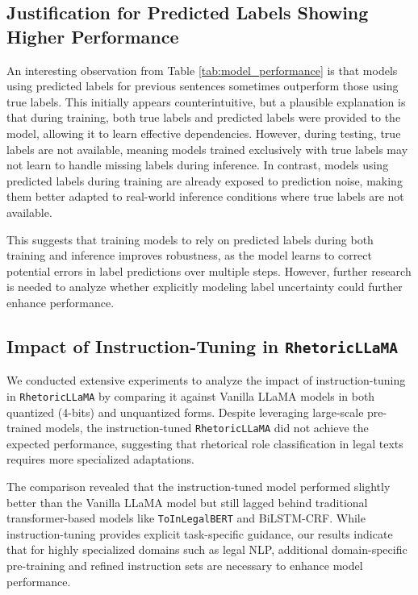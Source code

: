 \subsection{Justification for Predicted Labels Showing Higher Performance}
An interesting observation from Table \ref{tab:model_performance} is that models using predicted labels for previous sentences sometimes outperform those using true labels. This initially appears counterintuitive, but a plausible explanation is that during training, both true labels and predicted labels were provided to the model, allowing it to learn effective dependencies. However, during testing, true labels are not available, meaning models trained exclusively with true labels may not learn to handle missing labels during inference. In contrast, models using predicted labels during training are already exposed to prediction noise, making them better adapted to real-world inference conditions where true labels are not available.

This suggests that training models to rely on predicted labels during both training and inference improves robustness, as the model learns to correct potential errors in label predictions over multiple steps. However, further research is needed to analyze whether explicitly modeling label uncertainty could further enhance performance.

\subsection{Impact of Instruction-Tuning in \texttt{RhetoricLLaMA}}
We conducted extensive experiments to analyze the impact of instruction-tuning in \texttt{RhetoricLLaMA} by comparing it against Vanilla LLaMA models in both quantized (4-bits) and unquantized forms. Despite leveraging large-scale pre-trained models, the instruction-tuned \texttt{RhetoricLLaMA} did not achieve the expected performance, suggesting that rhetorical role classification in legal texts requires more specialized adaptations.

The comparison revealed that the instruction-tuned model performed slightly better than the Vanilla LLaMA model but still lagged behind traditional transformer-based models like \texttt{ToInLegalBERT} and BiLSTM-CRF. While instruction-tuning provides explicit task-specific guidance, our results indicate that for highly specialized domains such as legal NLP, additional domain-specific pre-training and refined instruction sets are necessary to enhance model performance.


